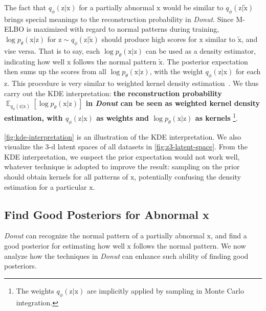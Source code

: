 \documentclass[sigconf]{acmart}
\newcommand{\DONUT}{\textit{Donut}}
\newcommand{\vv}[1]{\bm{\mathrm{{#1}}}}
\newcommand{\EEE}[2]{\operatorname{\mathbb{E}}_{{#1}}\left[{#2}\right]}
\begin{document}
The fact that $q_{\phi}(\vv{z}|\vv{x})$ for a partially abnormal $\vv{x}$ would be similar to $q_{\phi}(\vv{z}|\tilde{\vv{x}})$ brings special meanings to the reconstruction probability in \DONUT{}.
Since M-ELBO is maximized with regard to normal patterns during training, $\log p_{\theta}(\vv{x}|\vv{z})$ for $\vv{z} \sim q_{\phi}(\vv{z}|\tilde{\vv{x}})$ should produce high scores for $\vv{x}$ similar to $\tilde{\vv{x}}$, and vise versa.
That is to say, each $\log p_{\theta}(\vv{x}|\vv{z})$ can be used as a density estimator, indicating how well $\vv{x}$ follows the normal pattern $\tilde{\vv{x}}$.
The posterior expectation then sums up the scores from all $\log p_{\theta}(\vv{x}|\vv{z})$, with the weight $q_{\phi}(\vv{z}|\vv{x})$ for each $\vv{z}$.
This procedure is very similar to weighted kernel density estimation~\cite{wkde1,wkde2}.
We thus carry out the KDE interpretation: \textbf{the reconstruction probability $\EEE{q_{\phi}(\vv{z}|\vv{x})}{\log p_{\theta}(\vv{x}|\vv{z})}$ in \DONUT{} can be seen as weighted kernel density estimation, with $q_{\phi}(\vv{z}|\vv{x})$ as weights and $\log p_{\theta}(\vv{x}|\vv{z})$ as kernels}
\footnote{The weights $q_{\phi}(\vv{z}|\vv{x})$ are implicitly applied by sampling in Monte Carlo integration.}.

\cref{fig:kde-interpretation} is an illustration of the KDE interpretation.
We also visualize the 3-d latent spaces of all datasets in \cref{fig:z3-latent-space}.
From the KDE interpretation, we suspect the prior expectation would not work well, whatever technique is adopted to improve the result: sampling on the prior should obtain kernels for all patterns of $\vv{x}$, potentially confusing the density estimation for a particular $\vv{x}$.


\subsection{Find Good Posteriors for Abnormal x}
\label{sec:find-better-posterior}

\DONUT{} can recognize the normal pattern of a partially abnormal $\vv{x}$, and find a good posterior for estimating how well $\vv{x}$ follows the normal pattern. We now analyze how the techniques in \DONUT{} can enhance such ability of finding good posteriors.
\end{document}
